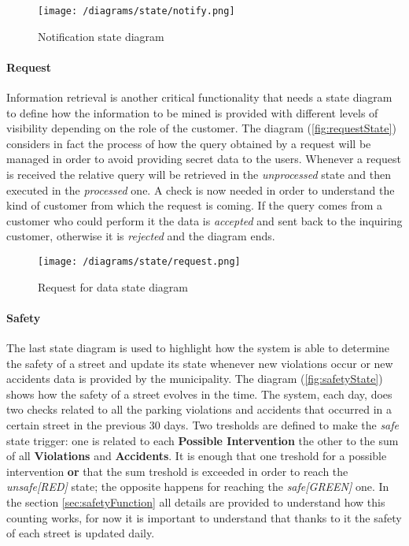 			\vspace{0.3cm}
			\begin{figure}[h]
				\centering
				\texttt{[image: /diagrams/state/notify.png]}
				\caption{\label{fig:notifyState}Notification state diagram}
			\end{figure}
		
		\paragraph{Request}
			Information retrieval is another critical functionality that needs a state diagram to define how the information to be mined is provided with different levels of visibility depending on the role of the customer. The diagram (\autoref{fig:requestState}) considers in fact the process of how the query obtained by a request will be managed in order to avoid providing secret data to the users. Whenever a request is received the relative query will be retrieved in the \textit{unprocessed} state and then executed in the \textit{processed} one. A check is now needed in order to understand the kind of customer from which the request is coming. If the query comes from a customer who could perform it the data is \textit{accepted} and sent back to the inquiring customer, otherwise it is \textit{rejected} and the diagram ends.
			
			\vspace{0.3cm}
			\begin{figure}[h]
				\centering
				\texttt{[image: /diagrams/state/request.png]}
				\caption{\label{fig:requestState}Request for data state diagram}
			\end{figure}
		
		\paragraph{Safety}
			The last state diagram is used to highlight how the system is able to determine the safety of a street and update its state whenever new violations occur or new accidents data is provided by the municipality. The diagram (\autoref{fig:safetyState}) shows how the safety of a street evolves in the time. The system, each day, does two checks related to all the parking violations and accidents that occurred in a certain street in the previous 30 days. Two tresholds are defined to make the \textit{safe} state trigger: one is related to each \textbf{Possible Intervention} the other to the sum of all \textbf{Violations} and \textbf{Accidents}. It is enough that one treshold for a possible intervention \textbf{or} that the sum treshold is exceeded in order to reach the \textit{unsafe[RED]} state; the opposite happens for reaching the \textit{safe[GREEN]} one. In the section \ref{sec:safetyFunction} all details are provided to understand how this counting works, for now it is important to understand that thanks to it the safety of each street is updated daily.
			
